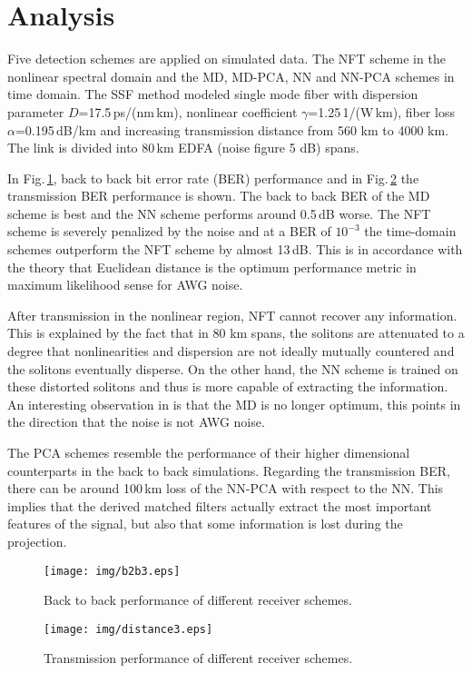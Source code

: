 \section{Analysis}
Five detection schemes are applied on simulated data. The NFT scheme in the nonlinear spectral domain and the MD, MD-PCA, NN and NN-PCA schemes in time domain. The SSF method modeled single mode fiber with dispersion parameter $D$=17.5\,ps/(nm\,km), nonlinear coefficient $\gamma$=1.25\,1/(W\,km), fiber loss $\alpha$=0.195\,dB/km and increasing transmission distance from 560 km to 4000 km. The link is divided into 80\,km EDFA (noise figure 5 dB) spans.

In Fig.\,\ref{fig:b2b}, back to back bit error rate (BER) performance and in Fig.\,\ref{fig:distance} the transmission BER performance is shown. The back to back BER of the MD scheme is best and the NN scheme performs around 0.5\,dB worse. The NFT scheme is severely penalized by the noise and at a BER of $10^{-3}$ the time-domain schemes outperform the NFT scheme by almost 13\,dB. This is in accordance with the theory that Euclidean distance is the optimum performance metric in maximum likelihood sense for AWG noise\cite{proakis95}.

After transmission in the nonlinear region, NFT cannot recover any information. This is explained by the fact that in 80 km spans, the solitons are attenuated to a degree that nonlinearities and dispersion are not ideally mutually countered and the solitons eventually disperse. On the other hand, the NN scheme is trained on these distorted solitons and thus is more capable of extracting the information. An interesting observation in  is that the MD is no longer optimum, this points in the direction that the noise is not AWG noise.

The PCA schemes resemble the performance of their higher dimensional counterparts in the back to back simulations. Regarding the transmission BER, there can be around 100\,km loss of the NN-PCA with respect to the NN. This implies that the derived matched filters actually extract the most important features of the signal, but also that some information is lost during the projection.

\begin{figure}[!tbp]
  \centering
    \texttt{[image: img/b2b3.eps]}
    \caption{Back to back performance of different receiver schemes.}
    \label{fig:b2b}
\end{figure}
\begin{figure}[!tbp]
    \texttt{[image: img/distance3.eps]}
    \caption{Transmission performance of different receiver schemes.}
    \label{fig:distance}
\end{figure}

